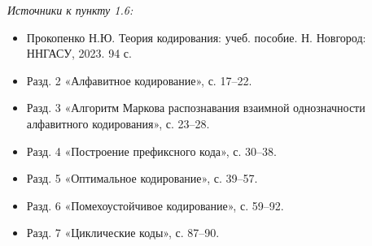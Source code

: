 \documentclass[a4paper,12pt]{article}
\begin{document}
\noindent\textit{Источники к пункту 1.6:}
\begin{itemize}
\item Прокопенко Н.Ю. Теория кодирования: учеб. пособие. Н. Новгород: ННГАСУ, 2023. 94 с.
\item Разд. 2 «Алфавитное кодирование», с. 17--22.
\item Разд. 3 «Алгоритм Маркова распознавания взаимной однозначности алфавитного кодирования», с. 23--28.
\item Разд. 4 «Построение префиксного кода», с. 30--38.
\item Разд. 5 «Оптимальное кодирование», с. 39--57.
\item Разд. 6 «Помехоустойчивое кодирование», с. 59--92.
\item Разд. 7 «Циклические коды», с. 87--90.
\end{itemize}
\end{document}
